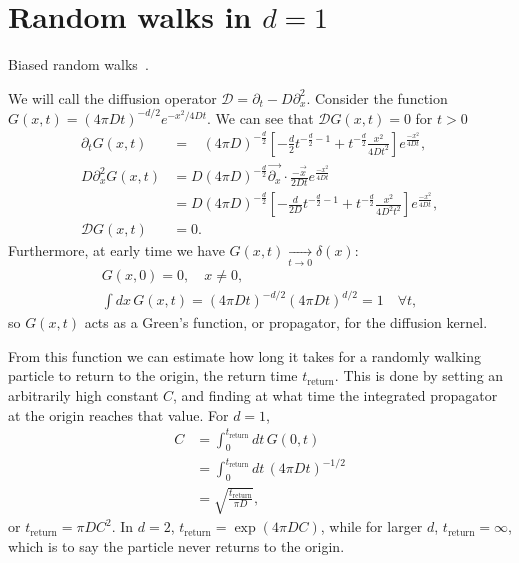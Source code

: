 \documentclass[a4paper,11pt]{article}
\newcommand{\ret}{\text{return}}
\newcommand{\nn}{\nonumber\\}
\begin{document}
\nocite{apsrev41Control}


\appendix


\section{Random walks in $d=1$} \label{sec:walks}

Biased random walks~\cite{RoussellStatMech}.

We will call the diffusion operator $\mathcal{D} = \partial_t-D\partial_x^2$. Consider the function $G(x,t)=(4\pi Dt)^{-d/2} e^{-x^2/4Dt}$. We can see that $\mathcal{D}G(x,t)=0$ for $t>0$ 
\begin{align}
\partial_t G(x,t) &= \phantom{D}(4\pi D)^{-\frac{d}{2}} \left[-\frac{d}{2} 
t^{-\frac{d}{2}-1} + t^{-\frac{d}{2}}\frac{x^2}{4Dt^2} \right]
e^{\frac{-x^2}{4Dt}},\\
D\partial_x^2 G(x,t) &= D(4\pi D)^{-\frac{d}{2}} \vec{\partial_x}\cdot 
\frac{-\vec{x}}{2Dt}e^{\frac{-x^2}{4Dt}} \nn
&= D(4\pi D)^{-\frac{d}{2}} \left[-\frac{d}{2D} 
t^{-\frac{d}{2}
	-1} + t^{-\frac{d}{2}}\frac{x^2}{4D^2t^2} \right]e^{\frac{-x^2}{4Dt}}, \\ 
\mathcal{D}G(x,t) &= 0.
\end{align}
Furthermore, at early time we have $G(x,t)\xrightarrow[t\to0]{}\delta(x)$:
\begin{align}
G(x,0) = 0, \quad x\ne 0,\\
\int dx\, G(x,t) = (4\pi Dt)^{-d/2}(4\pi Dt)^{d/2}=1\quad \forall t,
\end{align}
so $G(x,t)$ acts as a Green's function, or propagator, for the diffusion kernel.

From this function we can estimate how long it takes for a randomly walking particle to return to the origin, the return time $t_\ret$. This is done by setting an arbitrarily high constant $C$, and finding at what time the integrated propagator at the origin reaches that value. For $d=1$,
\begin{align}
C &= \int_{0}^{t_\ret}dt\,G(0,t)\\
&= \int_{0}^{t_\ret}dt\, (4\pi Dt)^{-1/2}\\
&= \sqrt{\frac{t_\ret}{\pi D}},
\end{align}
or $t_\ret=\pi D C^2$. In $d=2$, $t_\ret=\exp(4\pi DC)$, while for larger $d$, $t_\ret=\infty$, which is to say the particle never returns to the origin. 
\end{document}
